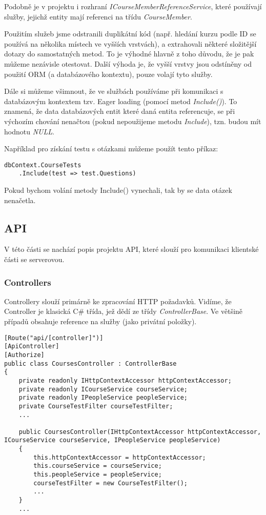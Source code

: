 Podobně je v projektu i rozhraní \textit{ICourseMemberReferenceService}, které používají služby, jejichž entity mají referenci na třídu \textit{CourseMember}.

Použitím služeb jsme odstranili duplikátní kód (např. hledání kurzu podle ID se používá na několika místech ve vyšších vrstvách), a extrahovali některé složitější dotazy do samostatných metod. To je výhodné hlavně z toho důvodu, že je pak můžeme nezávisle otestovat. Další výhoda je, že vyšší vrstvy jsou odstíněny od použití ORM (a databázového kontextu), pouze volají tyto služby.

Dále si můžeme všimnout, že ve službách používáme při komunikaci s databázovým kontextem tzv. Eager loading (pomocí metod \textit{Include()}). To znamená, že data databázových entit které daná entita referencuje, se při výchozím chování nenačtou (pokud nepoužijeme metodu \textit{Include}), tzn. budou mít hodnotu \textit{NULL}.

Například pro získání testu s otázkami můžeme použít tento příkaz:
\begin{lstlisting}
dbContext.CourseTests
	.Include(test => test.Questions)
\end{lstlisting}
Pokud bychom volání metody Include() vynechali, tak by se data otázek nenačetla.

\subsection{API}
V této části se nachází popis projektu API, které slouží pro komunikaci klientské části se serverovou.

\subsubsection*{Controllers}
Controllery slouží primárně ke zpracování HTTP požadavků. Vidíme, že Controller je klasická C\# třída, jež dědí ze třídy \textit{ControllerBase}. Ve většině případů obsahuje reference na služby (jako privátní položky).

\begin{lstlisting}
[Route("api/[controller]")]
[ApiController]
[Authorize]
public class CoursesController : ControllerBase
{
	private readonly IHttpContextAccessor httpContextAccessor;
	private readonly ICourseService courseService;
	private readonly IPeopleService peopleService;
	private CourseTestFilter courseTestFilter;
	...
	
	public CoursesController(IHttpContextAccessor httpContextAccessor, ICourseService courseService, IPeopleService peopleService)
	{
		this.httpContextAccessor = httpContextAccessor;
		this.courseService = courseService;
		this.peopleService = peopleService;
		courseTestFilter = new CourseTestFilter();
		...
	}
	...
\end{lstlisting}

